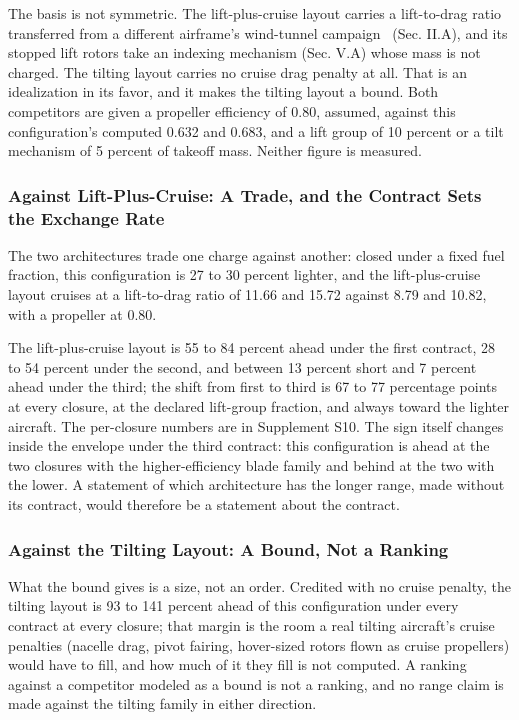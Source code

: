 \documentclass[journal]{new-aiaa}
\begin{document}
The basis is not symmetric. The lift-plus-cruise layout carries a lift-to-drag ratio transferred from a different airframe's wind-tunnel campaign~\cite{r14} (Sec. II.A), and its stopped lift rotors take an indexing mechanism (Sec. V.A) whose mass is not charged. The tilting layout carries no cruise drag penalty at all. That is an idealization in its favor, and it makes the tilting layout a bound. Both competitors are given a propeller efficiency of 0.80, assumed, against this configuration's computed 0.632 and 0.683, and a lift group of 10 percent or a tilt mechanism of 5 percent of takeoff mass. Neither figure is measured.

\subsubsection{Against Lift-Plus-Cruise: A Trade, and the Contract Sets the Exchange Rate}

The two architectures trade one charge against another: closed under a fixed fuel fraction, this configuration is 27 to 30 percent lighter, and the lift-plus-cruise layout cruises at a lift-to-drag ratio of 11.66 and 15.72 against 8.79 and 10.82, with a propeller at 0.80.

The lift-plus-cruise layout is 55 to 84 percent ahead under the first contract, 28 to 54 percent under the second, and between 13 percent short and 7 percent ahead under the third; the shift from first to third is 67 to 77 percentage points at every closure, at the declared lift-group fraction, and always toward the lighter aircraft. The per-closure numbers are in Supplement S10. The sign itself changes inside the envelope under the third contract: this configuration is ahead at the two closures with the higher-efficiency blade family and behind at the two with the lower. A statement of which architecture has the longer range, made without its contract, would therefore be a statement about the contract.

\subsubsection{Against the Tilting Layout: A Bound, Not a Ranking}

What the bound gives is a size, not an order. Credited with no cruise penalty, the tilting layout is 93 to 141 percent ahead of this configuration under every contract at every closure; that margin is the room a real tilting aircraft's cruise penalties (nacelle drag, pivot fairing, hover-sized rotors flown as cruise propellers) would have to fill, and how much of it they fill is not computed. A ranking against a competitor modeled as a bound is not a ranking, and no range claim is made against the tilting family in either direction.
\end{document}

